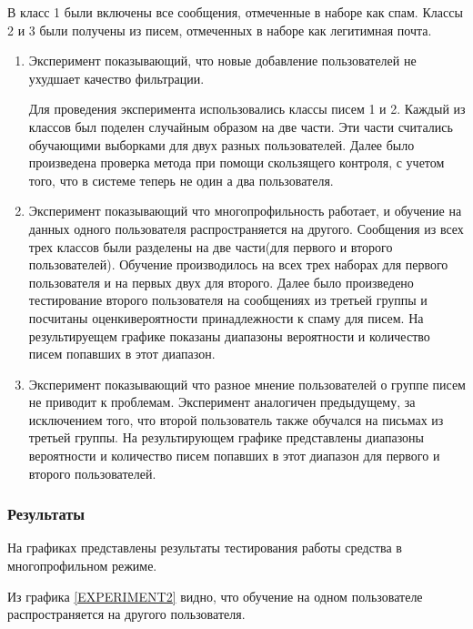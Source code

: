 В класс 1 были включены все сообщения, отмеченные в наборе \cite{SAPC} как спам. Классы 2 и 3 были получены из писем, отмеченных в наборе \cite{SAPC} как легитимная почта.
\begin{enumerate}
	\item Эксперимент показывающий, что новые добавление пользователей не ухудшает качество фильтрации.

	Для проведения эксперимента использовались классы писем 1 и 2. Каждый из классов был поделен случайным образом на две части. Эти части считались обучающими выборками для двух разных пользователей. Далее было произведена проверка метода при помощи скользящего контроля, с учетом того, что в системе теперь не один а два пользователя.

	\item Эксперимент показывающий что многопрофильность работает, и обучение на данных одного пользователя распространяется на другого. Сообщения из всех трех классов были разделены на две части(для первого и второго пользователей). Обучение производилось на всех трех наборах для первого пользователя и на первых двух для второго. Далее было произведено тестирование второго пользователя на сообщениях из третьей группы и посчитаны оценкивероятности принадлежности к спаму для писем. На результируещем графике показаны диапазоны вероятности и количество писем попавших в этот диапазон.

	\item Эксперимент показывающий что разное мнение пользователей о группе писем не приводит к проблемам. Эксперимент аналогичен предыдущему, за исключением того, что второй пользователь также обучался на письмах из третьей группы. На результирующем графике представлены диапазоны вероятности и количество писем попавших в этот диапазон для первого и второго пользователей. 
	
\end{enumerate}
\subsubsection{Результаты}
На графиках представлены результаты тестирования работы средства в многопрофильном режиме. 

Из графика \ref{EXPERIMENT2} видно, что обучение на одном пользователе распространяется на другого пользователя.

